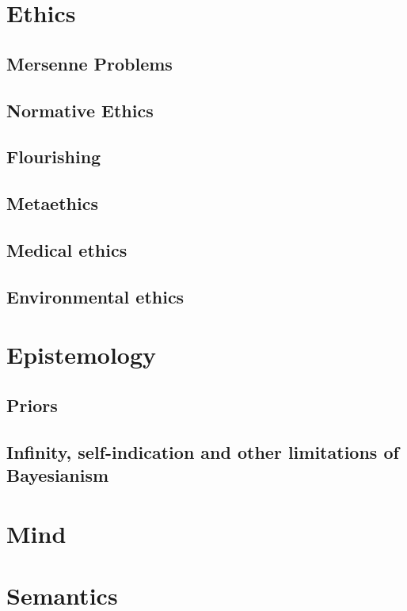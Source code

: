 \def\mychapter{II}

\chapter{Ethics}\label{ch:ethics}
\section{Mersenne Problems}
\section{Normative Ethics}
\section{Flourishing}
\section{Metaethics}
\section{Medical ethics}
\section{Environmental ethics}
\chaptertail 

\def\mychapter{III}

\chapter{Epistemology}\label{ch:epistemology}
\section{Priors}
\section{Infinity, self-indication and other limitations of Bayesianism}
\chaptertail 

\def\mychapter{IV}

\chapter{Mind}\label{ch:mind}
\chaptertail 

\def\mychapter{V}

\chapter{Semantics}\label{ch:semantics}
\chaptertail

